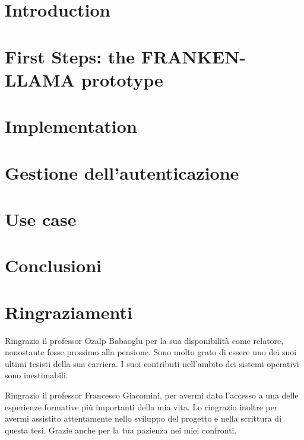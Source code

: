 \documentclass[12pt,a4paper,openright,twoside]{report}
\begin{document}
\chapter{Introduction}
\lhead[\fancyplain{}{\bfseries\thepage}]{\fancyplain{}{\bfseries\rightmark}}


\chapter{First Steps: the FRANKEN-LLAMA prototype}
\lhead[\fancyplain{}{\bfseries\thepage}]{\fancyplain{}{\bfseries\rightmark}}


\chapter{Implementation}
\lhead[\fancyplain{}{\bfseries\thepage}]{\fancyplain{}{\bfseries\rightmark}}


\chapter{Gestione dell'autenticazione}
\lhead[\fancyplain{}{\bfseries\thepage}]{\fancyplain{}{\bfseries\rightmark}}


\chapter{Use case}
\lhead[\fancyplain{}{\bfseries\thepage}]{\fancyplain{}{\bfseries\rightmark}}


\chapter{Conclusioni}
\lhead[\fancyplain{}{\bfseries\thepage}]{\fancyplain{}{\bfseries\rightmark}}




\chapter*{Ringraziamenti}
Ringrazio il professor Ozalp Babaoglu per la sua disponibilità come relatore, nonostante fosse prossimo alla pensione. 
Sono molto grato di essere uno dei suoi ultimi tesisti della sua carriera. I suoi contributi nell'ambito dei sistemi operativi sono inestimabili.  


Ringrazio il professor Francesco Giacomini, per avermi dato l'accesso a una delle esperienze formative più importanti della mia vita. Lo ringrazio 
inoltre per avermi assistito attentamente nello sviluppo del progetto e nella scrittura di questa tesi. Grazie anche per la tua pazienza nei miei confronti.  
\end{document}
